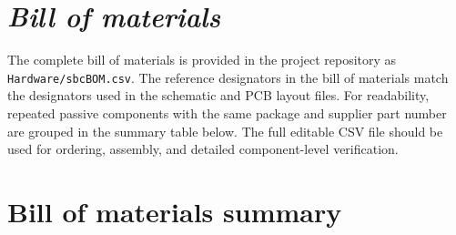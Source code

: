 \section*{\textit{Bill of materials}}

The complete bill of materials is provided in the project repository as \texttt{Hardware/sbcBOM.csv}. The reference designators in the bill of materials match the designators used in the schematic and PCB layout files. For readability, repeated passive components with the same package and supplier part number are grouped in the summary table below. The full editable CSV file should be used for ordering, assembly, and detailed component-level verification.

\section{Bill of materials summary}

